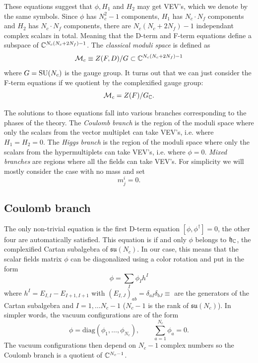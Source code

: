     These equations suggest that $\phi,H_1$ and $H_2$ may get VEV's, which we denote by the same symbols. Since $\phi$ has $N^2_c-1$ components, $H_1$ has $N_c\cdot N_f$ components and $H_2$ has $N_c\cdot N_f$ components, there are $N_c(N_c+2N_f)-1$ independant complex scalars in total. Meaning that the D-term and F-term equations define a subspace of $\mathbb{C}^{N_c(N_c+2N_f)-1}$. The \emph{classical moduli space} is defined as
    \begin{equation}
        \mathcal{M}_c\equiv Z(F,D)/G\subset \mathbb{C}^{N_c(N_c+2N_f)-1}
    \end{equation}
    where $G=\text{SU}(N_c)$ is the gauge group. It turns out that we can just consider the F-term equations if we quotient by the complexified gauge group:
    \begin{equation}
        \mathcal{M}_c = Z(F)/G_{\mathbb{C}}.
    \end{equation}

    The solutions to those equations fall into various branches corresponding to the phases of the theory. The \emph{Coulomb branch} is the region of the moduli space where only the scalars from the vector multiplet can take VEV's, i.e. where $H_1=H_2=0$. The \emph{Higgs branch} is the region of the moduli space where only the scalars from the hypermultiplets can take VEV's, i.e. where $\phi=0$. \emph{Mixed branches} are regions where all the fields can take VEV's. For simplicity we will mostly consider the case with no mass and set
    \begin{equation}
        m^i_j=0.
    \end{equation}

    \subsection{Coulomb branch}

        The only non-trivial equation is the first D-term equation $[\phi,\phi^\dagger]=0$, the other four are automatically satisfied. This equation is if and only $\phi$ belongs to $\mathfrak{h}_{\mathbb{C}}$, the complexified Cartan subalgebra of $\mathfrak{su}(N_c)$. In our case, this means that the scalar fields matrix $\phi$ can be diagonalized using a color rotation and put in the form
        \begin{equation}
            \phi = \sum_I \phi_Ih^I
        \end{equation}
        where $h^I=E_{I,I}-E_{I+1,I+1}$ with $(E_{I,J})_{ab}=\delta_{aI}\delta_{bJ}\equiv$ are the generators of the Cartan subalgebra and $I=1,\dots N_c-1$ ($N_c-1$ is the rank of $\mathfrak{su}(N_c)$). In simpler words, the vacuum configurations are of the form
        \begin{equation}
            \phi=\text{diag}(\phi_1,\dots,\phi_{N_c}),\qquad \sum^{N_c}_{a=1}\phi_a=0.\label{eq:diagform}
        \end{equation}
        The vacuum configurations then depend on $N_c-1$ complex numbers so the Coulomb branch is a quotient of $\mathbb{C}^{N_c-1}$.
        
